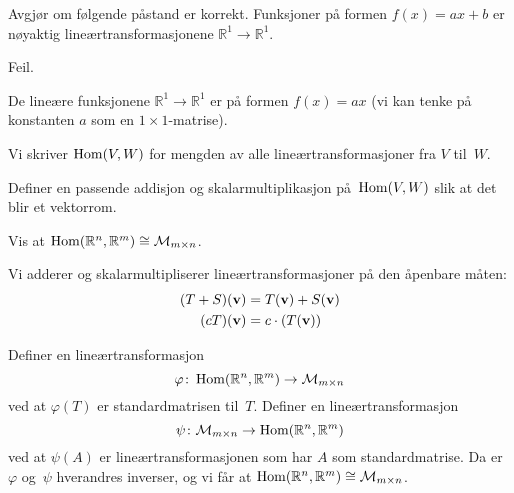 
\begin{oppgave}
Avgjør om følgende påstand er korrekt. Funksjoner på formen $f(x)=ax+b$ er nøyaktig lineærtransformasjonene $\mathbb{R}^1\rightarrow \mathbb{R}^1$.
\end{oppgave}
\begin{losning}
Feil.

\noindent
De lineære funksjonene $\mathbb{R}^1\rightarrow \mathbb{R}^1$ er på formen $f(x)=ax$ (vi kan tenke på konstanten $a$ som en $1\times 1$-matrise).
\end{losning}

\begin{oppgave}
Vi skriver $\operatorname{Hom}(V,W)$ for mengden av alle lineærtransformasjoner fra
$V$ til~$W$.
\begin{punkt}
Definer en passende addisjon og skalarmultiplikasjon på~$\operatorname{Hom}(V,W)$
slik at det blir et vektorrom.
\end{punkt}
\begin{punkt}
Vis at $\operatorname{Hom}(\mathbb{R}^n, \mathbb{R}^m) \cong \mathcal{M}_{m \times n}$.
\end{punkt}
\end{oppgave}

\begin{losning}
\begin{punkt}
Vi adderer og skalarmultipliserer lineærtransformasjoner på den
åpenbare måten:
\begin{align*}
(T + S)(\mathbf{v}) &= T(\mathbf{v}) + S(\mathbf{v}) \\
(cT)(\mathbf{v}) &= c \cdot (T(\mathbf{v}))
\end{align*}
\end{punkt}
\begin{punkt}
Definer en lineærtransformasjon
\[
\varphi \colon \operatorname{Hom}(\mathbb{R}^n, \mathbb{R}^m) \to \mathcal{M}_{m \times n}
\]
ved at $\varphi(T)$ er standardmatrisen til~$T$.  Definer en
lineærtransformasjon
\[
\psi \colon \mathcal{M}_{m \times n} \to \operatorname{Hom}(\mathbb{R}^n, \mathbb{R}^m)
\]
ved at $\psi(A)$ er lineærtransformasjonen som har $A$ som
standardmatrise.  Da er $\varphi$ og~$\psi$ hverandres inverser, og vi
får at $\operatorname{Hom}(\mathbb{R}^n, \mathbb{R}^m) \cong \mathcal{M}_{m \times n}$.
\end{punkt}
\end{losning}




